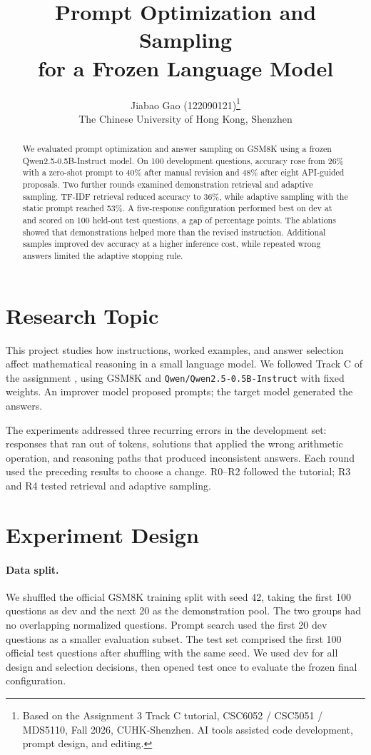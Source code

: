 \documentclass{article}
\title{Prompt Optimization and Sampling\\for a Frozen Language Model}
\author{Jiabao Gao (122090121)\thanks{Based on the Assignment 3 Track C tutorial,
CSC6052 / CSC5051 / MDS5110, Fall 2026, CUHK-Shenzhen.
AI tools assisted code development, prompt design, and editing.}\\
The Chinese University of Hong Kong, Shenzhen}
\begin{document}
\maketitle
\raggedbottom
\begin{abstract}
We evaluated prompt optimization and answer sampling on GSM8K using a frozen
Qwen2.5-0.5B-Instruct model. On 100 development questions, accuracy rose from
26\% with a zero-shot prompt to 40\% after manual revision and 48\% after
eight API-guided proposals. Two further rounds examined demonstration retrieval
and adaptive sampling. TF-IDF retrieval reduced accuracy to 36\%, while
adaptive sampling with the static prompt reached 53\%. A five-response
configuration performed best on dev at \FinalDev{} and scored \FinalTest{}
on 100 held-out test questions, a gap of \FinalGap{} percentage points.
The ablations showed that demonstrations helped more than the revised
instruction. Additional samples improved dev accuracy at a higher inference cost,
while repeated wrong answers limited the adaptive stopping rule.
\end{abstract}

\section{Research Topic}
This project studies how instructions, worked examples, and answer selection
affect mathematical reasoning in a small language model. We followed Track C
of the assignment \citep{course}, using GSM8K and
\texttt{Qwen/Qwen2.5-0.5B-Instruct} \citep{qwen} with fixed weights.
An improver model proposed prompts; the target model generated the answers.

The experiments addressed three recurring errors in the development set:
responses that ran out of tokens, solutions that applied the wrong arithmetic
operation, and reasoning paths that produced inconsistent answers. Each round
used the preceding results to choose a change. R0--R2 followed the tutorial;
R3 and R4 tested retrieval and adaptive sampling.

\section{Experiment Design}
\paragraph{Data split.}
We shuffled the official GSM8K training split with seed 42, taking the first
100 questions as dev and the next 20 as the demonstration pool.
The two groups had no overlapping normalized questions. Prompt search used
the first 20 dev questions as a smaller evaluation subset. The test set
comprised the first 100 official test questions after shuffling with the
same seed. We used dev for all design and selection decisions, then opened
test once to evaluate the frozen final configuration.
\end{document}
